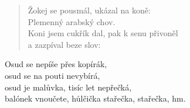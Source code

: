 \begin{song}{}
\begin{verse}
   Žokej se pousmál, ukázal na koně: \\
   Plemenný arabský chov. \\
   Koni jsem cukřík dal, pak k senu přivoněl \\
   a zazpíval beze slov:
\end{verse}
\begin{refren}
   Osud se nepíše přes kopírák, \\
   osud se na pouti nevybírá, \\
   osud je malůvka, tisíc let nepřečká, \\
   balónek vnoučete, hůlčička stařečka, stařečka, hm.
\end{refren}
\end{song}
\pagebreak
